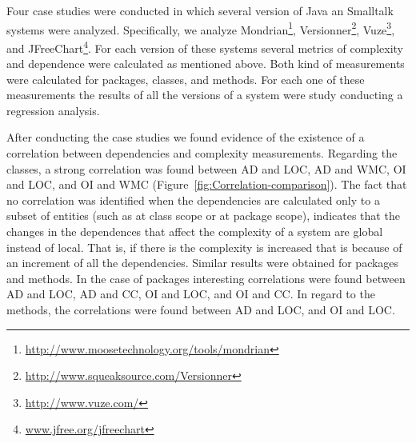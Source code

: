 \documentclass{sig-alternate}
\newcommand{\figref}[1]{Figure~\ref{fig:#1}}
\begin{document}
Four case studies were conducted in which several version of Java an Smalltalk systems were analyzed. Specifically, we analyze Mondrian\footnote{\url{http://www.moosetechnology.org/tools/mondrian}}, Versionner\footnote{\url{http://www.squeaksource.com/Versionner}}, Vuze\footnote{\url{http://www.vuze.com/}}, and JFreeChart\footnote{\url{www.jfree.org/jfreechart}}. For each version of these systems several metrics of complexity and dependence were calculated as mentioned above. Both kind of measurements were calculated for packages, classes, and methods. For each one of these measurements the results of all the versions of a system were study conducting a regression analysis.

After conducting the case studies we found evidence of the existence of a correlation between dependencies and complexity measurements.
Regarding the classes, a strong correlation was found between AD and LOC, AD and WMC, OI and LOC, and OI and WMC (\figref{Correlation-comparison}). The fact that no correlation was identified when the dependencies are calculated only to a subset of entities (such as at class scope or at package scope), indicates that the changes in the dependences that affect the complexity of a system are global instead of local. That is, if there is the complexity is  increased that is because of an increment of all the dependencies.
Similar results were obtained for packages and methods. In the case of packages interesting correlations were found between AD and LOC, AD and CC, OI and LOC, and OI and CC. In regard to the methods, the correlations were found between  AD and LOC, and OI and LOC. 
\end{document}
